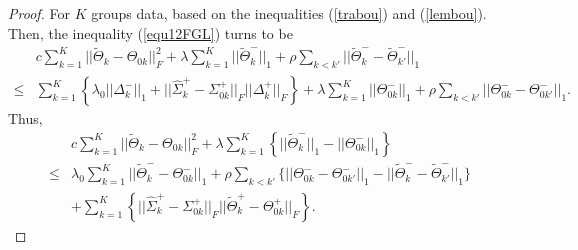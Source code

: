 \documentclass[review]{elsarticle}
\newcommand{\1}{{\bf 1}}
\newcommand{\0}{{\bf 0}}
\newtheorem{proof}{Proof}
\begin{document}
\begin{appendices}
\begin{proof}
 For $K$ groups data, based on the inequalities (\ref{trabou}) and (\ref{lembou}).
 Then, the inequality (\ref{equ12FGL}) turns to be
\begin{equation}
\begin{aligned}
&c\sum_{k=1}^{K}||\widetilde{\Theta}_k-\Theta_{0k}||_{F}^{2}+
\lambda\sum_{k=1}^{K}||\widetilde{\Theta}_k^{-}||_1+
\rho\sum_{k<k'}||\widetilde{\Theta}_k^{-}-\widetilde{\Theta}_{k'}^{-}||_1\\
\leq &\sum_{k=1}^{K}\left\{\lambda_0||\Delta_k^{-}||_1
+||\widehat{\Sigma}_{k}^{+}-\Sigma_{0k}^{+}||_F||\Delta_k^{+}||_{F}\right\}+\lambda\sum_{k=1}^{K}||\Theta_{0k}^{-}||_1
+\rho\sum_{k<k'}||\Theta_{0k}^{-}-\Theta_{0k'}^{-}||_1.
\end{aligned}
\end{equation}
 Thus,
\begin{equation}\label{equa3needpro FGL}
\begin{split}
&c\sum_{k=1}^{K}||\widetilde{\Theta}_k-\Theta_{0k}||_{F}^{2}
+\lambda\sum_{k=1}^{K}\left\{||\widetilde{\Theta}_k^{-}||_1-||\Theta_{0k}^{-}||_1\right\}\\
\leq &\lambda_0\sum_{k=1}^{K}||\widetilde{\Theta}_k^{-}-\Theta_{0k}^{-}||_1
+\rho\sum_{k<k'}\Big\{||\Theta_{0k}^{-}-\Theta_{0k'}^{-}||_1-||\widetilde{\Theta}_k^{-}-\widetilde{\Theta}_{k'}^{-}||_1\Big\}\\
&+\sum_{k=1}^{K}\left\{||\widehat{\Sigma}_{k}^{+}-\Sigma_{0k}^{+}||_F||\widetilde{\Theta}_k^{+}-\Theta_{0k}^{+}||_{F}\right\}.
\end{split}
\end{equation}


\end{proof}
\end{appendices}
\end{document}
